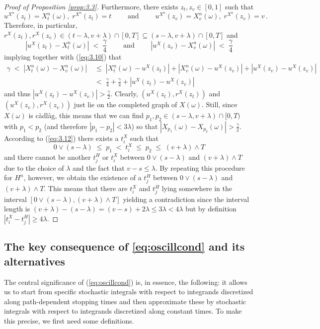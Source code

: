 \documentclass[11pt]{article}
\theoremstyle{definition}\newtheorem{example}[theorem]{Example}
\theoremstyle{definition}\newtheorem{counterexample}[theorem]{Counterexample}
\theoremstyle{definition}\newtheorem{remark}[theorem]{Remark}
\theoremstyle{definition}\newtheorem{defi}[theorem]{Definition}
\numberwithin{equation}{section}
\renewcommand{\|}{\; : \, \;}											%
\begin{document}
\begin{proof}[Proof of Proposition \ref{prop:3.3}]
	Furthermore, there exists $z_t, z_v \in [0,1]$ such that
	$$ u^{X^n}(z_t)=X^n_t(\omega), \; r^{X^n}(z_t)=t \qquad \text{ and } \qquad u^{X^n}(z_v)=X^n_v(\omega), \; r^{X^n}(z_v)=v \,.$$
	Therefore, in particular, $r^X(z_t), r^X(z_v) \in (t-\lambda, v+ \lambda)\cap [0,T] \subseteq (s-\lambda, v+\lambda) \cap [0,T]$ and 
	$$ |u^X(z_t) - X^n_t(\omega) | \; < \; \frac \gamma 4 \qquad \text{ and } \qquad |u^X(z_v) - X^n_v(\omega) | \; < \; \frac \gamma 4$$
	implying together with (\ref{eq:3.10}) that 
	\begin{align*}
		\gamma \; < \; |X^n_t(\omega) - X^n_v(\omega)| \; &\le \; |X^n_t(\omega) - u^X(z_t)|+ |X^n_v(\omega) - u^X(z_v)| + |u^X(z_v) - u^X(z_v)|\\
		& < \; \frac \gamma 4+ \frac \gamma 4 + |u^X(z_t) - u^X(z_v)|
	\end{align*}
	and thus $|u^X(z_t) - u^X(z_v)|  >  \frac \gamma 2$. Clearly, $(u^X(z_t),r^X(z_t))$ and $(u^X(z_v),r^X(z_v))$ just lie on the completed graph of $X(\omega)$. Still, since $X(\omega)$ is càdlàg, this means that we can find $p_1, p_2 \in (s-\lambda, v+ \lambda)\cap [0,T)$ with $p_1<p_2$ (and therefore $|p_1-p_2|< 3\lambda$) so that $|X_{p_1}(\omega) - X_{p_2}(\omega)|  >  \frac \gamma 2$.
	According to (\ref{eq:3.12}) there exists a $t^X_i$ such that
	$$ 0 \vee (s- \lambda) \; \le \; p_1 \; < \; t^X_i \; \le \; p_2 \; \le \; (v+ \lambda) \wedge T$$
	and there cannot be another $t_j^H$ or $t_i^X$ between $0\vee(s-\lambda)$ and $(v+\lambda) \wedge T$ due to the choice of $\lambda$ and the fact that $v-s\le \lambda$. By repeating this procedure for $H^n$, however, we obtain the existence of a $t_j^H$ between $0\vee(s-\lambda)$ and $(v+\lambda) \wedge T$. This means that there are $t_i^X$ and $t_j^H$ lying somewhere in the interval $[0\vee (s-\lambda), (v+\lambda)\wedge T]$ yielding a contradiction since the interval length is $(v+\lambda)-(s-\lambda)=(v-s)+2\lambda \le 3\lambda<4\lambda$ but by definition $|t_i^X-t_j^H|\ge 4\lambda$.
\end{proof}

\subsection{The key consequence of \eqref{eq:oscillcond} and its alternatives}
\label{subsec:Conseq_of_AVCO}

The central significance of (\ref{eq:oscillcond}) is, in essence, the following: it allows us to start from specific stochastic integrals with respect to integrands discretized along path-dependent stopping times and then approximate these by stochastic integrals with respect to integrands discretized along constant times. To make this precise, we first need some definitions.
\end{document}
